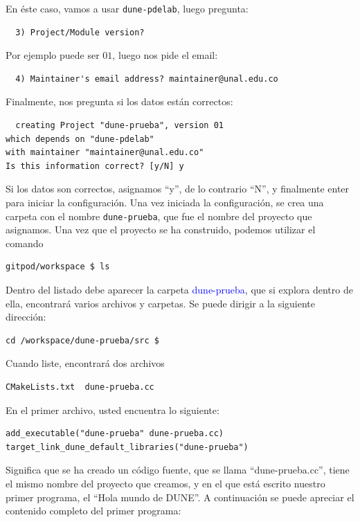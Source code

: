 En éste caso, vamos a usar \verb|dune-pdelab|, luego pregunta:

\begin{verbatim}
  3) Project/Module version? 
\end{verbatim}

Por ejemplo puede ser $01$, luego nos pide el email:

\begin{verbatim}
  4) Maintainer's email address? maintainer@unal.edu.co 
\end{verbatim}

Finalmente, nos pregunta si los datos están correctos:

\begin{verbatim}
  creating Project "dune-prueba", version 01 
which depends on "dune-pdelab"
with maintainer "maintainer@unal.edu.co"
Is this information correct? [y/N] y
\end{verbatim}

Si los datos son correctos, asignamos ``y'', de lo contrario ``N'', y
finalmente enter para iniciar la configuración.
Una vez iniciada la configuración, se crea una carpeta con el nombre
\verb|dune-prueba|, que fue el nombre del proyecto que asignamos.
Una vez que el proyecto se ha construido, podemos utilizar el comando
\begin{verbatim}
gitpod/workspace $ ls
\end{verbatim}

Dentro del listado debe aparecer la carpeta
\textcolor{blue}{dune-prueba}, que si explora dentro de ella,
encontrará varios archivos y carpetas.
Se puede dirigir a la siguiente dirección:
\begin{verbatim}
cd /workspace/dune-prueba/src $ 
\end{verbatim}
Cuando liste, encontrará dos archivos

\begin{verbatim}
CMakeLists.txt  dune-prueba.cc
\end{verbatim}

En el primer archivo, usted encuentra lo siguiente:

\begin{verbatim}
add_executable("dune-prueba" dune-prueba.cc)
target_link_dune_default_libraries("dune-prueba")
\end{verbatim}

Significa que se ha creado un código fuente, que se llama
``dune-prueba.cc'', tiene el mismo nombre del proyecto que creamos, y
en el que está escrito nuestro primer programa, el ``Hola mundo de DUNE''.
A continuación se puede apreciar el contenido completo del primer programa:

\begin{listing}
	\inputminted{cpp}{../../src/dune-learn.cc}
\end{listing}

